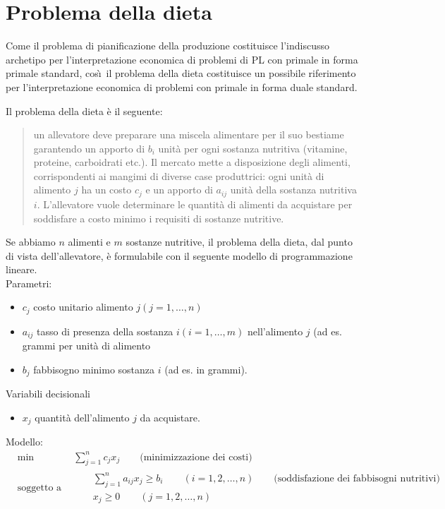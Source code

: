 \documentclass[a4paper,11pt]{article}
\begin{document}
	\section*{Problema della dieta}

        Come il problema di pianificazione della produzione costituisce l'indiscusso archetipo per l'interpretazione economica di problemi di PL con primale in forma primale standard, cos\`\i\ il problema della dieta costituisce un possibile riferimento per l'interpretazione economica di problemi con primale in forma duale standard.

        Il problema della dieta \`e il seguente:
        \begin{quote}
        un allevatore deve preparare una miscela alimentare per il suo bestiame garantendo un apporto di $b_i$ unità per ogni sostanza nutritiva
 (vitamine, proteine, carboidrati etc.).  Il mercato mette a disposizione degli alimenti, corrispondenti ai mangimi di diverse case produttrici:  ogni unità di alimento $j$ ha un costo $c_j$ e un apporto di $a_{ij}$ unità della sostanza nutritiva $i$.  L’allevatore vuole determinare le
        quantità di alimenti da acquistare per soddisfare a costo minimo i requisiti di sostanze nutritive.
        \end{quote}
        Se abbiamo $n$ alimenti e $m$
 sostanze nutritive, il problema della dieta,
 dal punto di vista dell’allevatore, è formulabile con il seguente modello di programmazione lineare.\\
 Parametri:
 \begin{itemize}
 \item $c_j$ costo unitario alimento $j (j=1,\ldots,n)$
 \item $a_{ij}$ tasso  di  presenza  della  sostanza $i (i= 1,\ldots,m)$  nell’alimento
 $j$
 (ad  es.   grammi  per
 unità di alimento
 \item $b_j$ fabbisogno minimo sostanza $i$ (ad es. in grammi).
\end{itemize}
Variabili decisionali
\begin{itemize}
	\item $x_j$ quantità dell'alimento $j$ da acquistare.
\end{itemize}	
Modello: 
\begin{equation}\begin{split}
&\text{min}\qquad\qquad\sum_{j=1}^{n}c_jx_j \qquad \text{(minimizzazione dei costi)}\\
&\text{soggetto a} \qquad\begin{split} &\sum_{j=1}^{n}a_{ij}x_j \geq b_i \qquad(i=1,2,\ldots,n)\qquad \text{(soddisfazione dei fabbisogni nutritivi)}\\
&x_j\geq0 \qquad(j=1,2,\ldots,n)\end{split}
\end{split}\end{equation}
\end{document}
